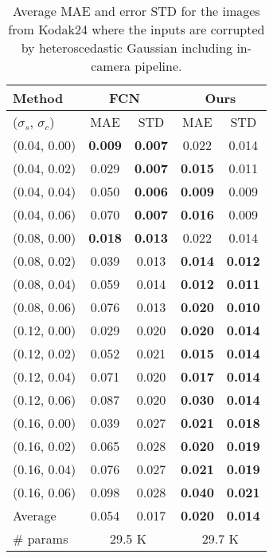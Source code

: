\documentclass[10pt,twocolumn,letterpaper]{article}
\begin{document}
\begin{table}[h]
	\centering
	\caption{Average MAE and error STD for the images from Kodak24 where the inputs are corrupted by heteroscedastic Gaussian including in-camera pipeline. }
	\label{table:estimator_more}
	\begin{adjustbox}{width=0.8\linewidth}
		\begin{tabular}{l|cc|cc}
			\toprule
			Method   & \multicolumn{2}{c|}{FCN~\cite{guo2019toward}} & \multicolumn{2}{c}{Ours} \\
			\hline 
			($\sigma_s$, $\sigma_c$) & MAE        & STD        & MAE           & STD          \\
			\hline \hline
			(0.04,	0.00) &	\textbf{0.009} &	\textbf{0.007} &	0.022 &	0.014 \\
			(0.04,	0.02) &	0.029 &\textbf{0.007} &	\textbf{0.015} &	0.011 \\
			(0.04,	0.04) &	0.050 &	\textbf{0.006} &	\textbf{0.009} &	0.009 \\
			(0.04,	0.06) &	0.070 &	\textbf{0.007} &	\textbf{0.016} &	0.009 \\
			(0.08,	0.00) &	\textbf{0.018} &	\textbf{0.013} &	0.022 &	0.014 \\
			(0.08,	0.02) &	0.039 &	0.013 &	\textbf{0.014} &	\textbf{0.012} \\ 
			(0.08,	0.04) &	0.059 &	0.014 &	\textbf{0.012} &	\textbf{0.011} \\
			(0.08,	0.06) &	0.076 &	0.013 &	\textbf{0.020} &	\textbf{0.010} \\
			(0.12,	0.00) &	0.029 &	0.020 &	\textbf{0.020} &	\textbf{0.014} \\ 
			(0.12,	0.02) &	0.052 &	0.021 &	\textbf{0.015} &	\textbf{0.014} \\ 
			(0.12,	0.04) &	0.071 &	0.020 &	\textbf{0.017} &	\textbf{0.014} \\
			(0.12,	0.06) &	0.087 &	0.020 &	\textbf{0.030} &	\textbf{0.014} \\ 
			(0.16,	0.00) &	0.039 &	0.027 &	\textbf{0.021} &	\textbf{0.018} \\ 
			(0.16,	0.02) &	0.065 &	0.028 &	\textbf{0.020} &	\textbf{0.019} \\ 
			(0.16,	0.04) &	0.076 &	0.027 &	\textbf{0.021} &	\textbf{0.019} \\ 
			(0.16,	0.06) &	0.098 &	0.028 &	\textbf{0.040} &	\textbf{0.021} \\						
			\hline
			Average & 0.054 & 0.017& \textbf{0.020}& \textbf{0.014}\\
			\hline
			\# params & \multicolumn{2}{c|}{29.5 K} & \multicolumn{2}{c}{29.7 K} \\			
			\bottomrule			
		\end{tabular}
	\end{adjustbox}
\end{table}
\end{document}

